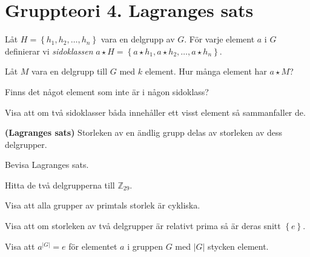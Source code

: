 \documentclass[11pt,fleqn]{book} %
\begin{document}
  \renewcommand*\rmdefault{ppl}\normalfont\upshape

\chapter{Gruppteori 4. Lagranges sats}
\large
\thispagestyle{empty} 

\begin{definition} Låt \(H = \left\{h_1, h_2, \dots, h_n\right\}\) vara en delgrupp av \(G\). För varje element \(a\) i \(G\) definierar vi \textit{sidoklassen} \(a \star H = \left\{a  \star h_1, a \star h_2, \dots, a \star h_n\right\}\).
\end{definition}

\begin{problem}
  Låt \(M\) vara en delgrupp till \(G\) med \(k\) element. Hur många element har \(a  \star M\)?
\end{problem}

\begin{problem} 
	Finns det något element som inte är i någon sidoklass?
\end{problem}

\begin{problem}
	Visa att om två sidoklasser båda innehåller ett visst element så sammanfaller de.
\end{problem}

\begin{theoremeT} \textbf{(Lagranges sats)} Storleken av en ändlig grupp delas av storleken av dess delgrupper.
\end{theoremeT} %

\begin{problem}
  Bevisa Lagranges sats.
\end{problem}

\begin{problem}
  Hitta de två delgrupperna till \(\mathbb{Z} _{29}\).
\end{problem}

\begin{problem}
  Visa att alla grupper av primtals storlek är cykliska.
\end{problem}

\begin{problem}
  Visa att om storleken av två delgrupper är relativt prima så är deras snitt \(\left\{e\right\}\).
\end{problem}

\begin{problem}
 Visa att \(a ^{|G|} = e\) för elementet \(a\) i gruppen \(G\) med \(|G| \) stycken element.
\end{problem}
\end{document}
